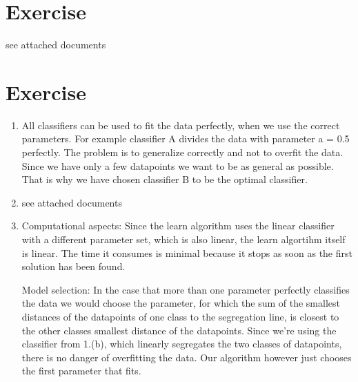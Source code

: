 \documentclass[a4paper]{article}
\begin{document}
\section{Exercise}
see attached documents
\section{Exercise}
\begin{enumerate}[label={(\alph*)}]
	\item All classifiers can be used to fit the data perfectly, when we use the correct parameters.
For example classifier A divides the data with parameter a = 0.5 perfectly.
The problem is to generalize correctly and not to overfit the data.
Since we have only a few datapoints we want to be as general as possible.
That is why we have chosen classifier B to be the optimal classifier.
	\item see attached documents
	\item Computational aspects:
Since the learn algorithm uses the linear classifier with a different parameter set, which is also linear,
the learn algortihm itself is linear. The time it consumes is minimal because it stops as soon as the first
solution has been found.

Model selection: In the case that more than one parameter perfectly classifies the data we would choose the parameter, for which the sum of the smallest distances of the datapoints of one class to the segregation line, is closest to the other classes smallest distance of the datapoints. Since we're using the classifier from 1.(b), which linearly segregates the two classes of datapoints, there is no danger of overfitting the data. Our algorithm however just chooses the first parameter that fits.
\end{enumerate}
\end{document}
